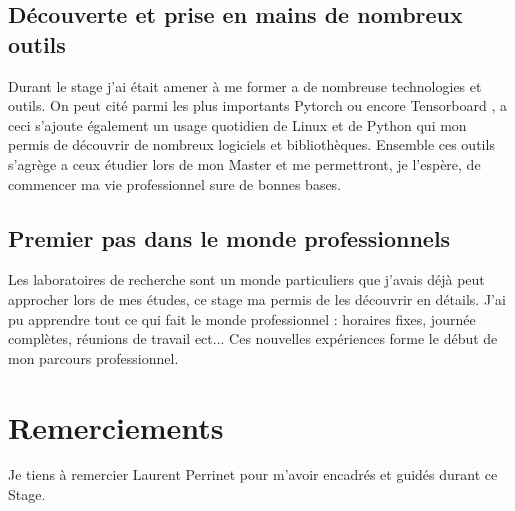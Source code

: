 \documentclass[11pt,francais]{article}
\begin{document}
\subsection{Découverte et prise en mains de nombreux outils}
Durant le stage j'ai était amener à me former a de nombreuse technologies et outils.
On peut cité parmi les plus importants Pytorch \cite{paszke2017automatic} ou encore Tensorboard \cite{tensorflow2015-whitepaper}, a ceci s'ajoute également un usage quotidien de Linux et de Python qui mon permis de découvrir de nombreux logiciels et bibliothèques.
Ensemble ces outils s'agrège a ceux étudier lors de mon Master et me permettront, je l'espère, de commencer ma vie professionnel sure de bonnes bases.

\subsection{Premier pas dans le monde professionnels}
Les laboratoires de recherche sont un monde particuliers que j'avais déjà peut approcher lors de mes études, ce stage ma permis de les découvrir en détails. J'ai pu apprendre tout ce qui fait le monde professionnel : horaires fixes, journée complètes, réunions de travail ect...
Ces nouvelles expériences forme le début de mon parcours professionnel.

\newpage


\section*{Remerciements}
Je tiens à remercier Laurent Perrinet pour m'avoir encadrés et guidés durant ce Stage.



\newpage
\end{document}
